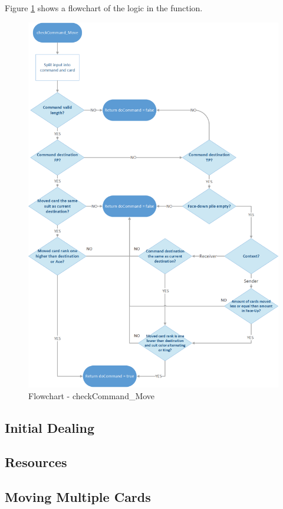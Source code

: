 \documentclass[runningheads,a4paper]{llncs}
\begin{document}
Figure \ref{fig:checkCommand_Move} shows a flowchart of the logic in the function.
\begin{figure}
	\begin{center}
		\includegraphics[width=\textwidth]{images/checkcommandmove}
		\caption{Flowchart - checkCommand\_Move}
		\label{fig:checkCommand_Move}
	\end{center}
\end{figure}
\clearpage
\subsection{Initial Dealing}
\subsection{Resources}
\label{sec:3_Resources}
\subsection{Moving Multiple Cards}
\end{document}
